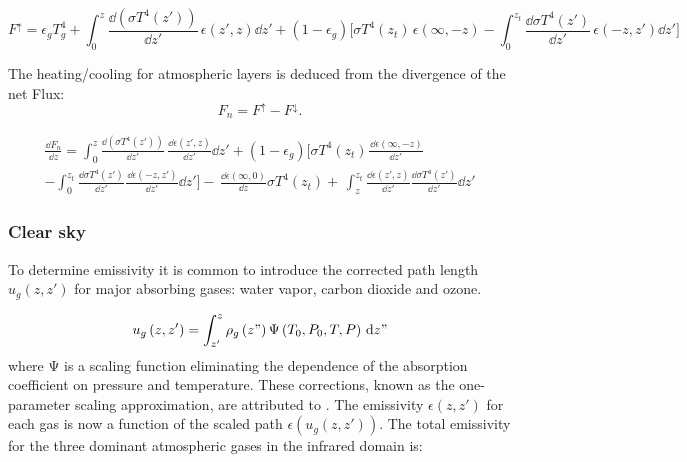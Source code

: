 \begin{equation}
F^\uparrow =\epsilon_{g}T_{g}^{4}+\int_0^z {\frac{\dd\left( \sigma
T^{4}\left( z' \right) \right)}{\dd z'}\, \epsilon \left( z',z
\right)\dd z'+\left( 1-\epsilon_{g} \right)[\sigma T^{4}} \left( z_t
\right)\, \epsilon \left( \infty ,-z \right)-\int_0^{z_t} \frac{\dd\sigma
T^{4}\left( z' \right)}{\dd z'} \, \epsilon (-z,z') \dd z']
\end{equation}

The heating/cooling for atmospheric layers is deduced from the divergence of
the net Flux:
\begin{equation}
F_{n}=F^\uparrow -F^\downarrow .
\end{equation}

\begin{multline}
\frac{\dd F_{n}}{\dd z}=\int_0^z {\frac{\dd\left( \sigma T^{4}\left( z' \right)
\right)}{\dd z'}\, \frac{\dd \epsilon \left( z',z
\right)}{\dd z'}\dd z'
+\left( 1-\epsilon_{g} \right)[\sigma T^{4}} \left(z_t \right)\frac{\, \dd\epsilon \left( \infty ,-z \right)}{\dd z'}\\
-\int_0^{z_t} \frac{\dd\sigma T^{4}\left( z' \right)}{\dd z'} \frac{\, \dd\epsilon \left( -z,z' \right)}{\dd z'}\dd z']
-\, \frac{\dd\epsilon \left( \infty ,0 \right)}{\dd z}\sigma T^{4}\left( z_t \right)
+\, \int_z^{z_t} {\frac{\dd\epsilon (z',z)}{\dd z'}\frac{\dd\sigma T^{4}(z')}{\dd z'}\dd z'}
\end{multline}

\subsubsection{Clear sky}
To determine emissivity it is common to introduce the corrected path length
$u_{g}(z,z')$ for major absorbing gases: water vapor, carbon dioxide and ozone.

\begin{equation}
u_{g}\left( z,z' \right)=\int_{z'}^{z} \rho_{g} \left( z"
\right)\mathrm{\Psi }\left( T_{0},P_{0},T,P \right)\, \mathrm{d} z"
\end{equation}
where $\mathrm{\Psi }$ is a scaling function eliminating the dependence of
the absorption coefficient on pressure and temperature. These corrections,
known as the one-parameter scaling approximation, are attributed to \cite{Chou:1980}.
The emissivity $\epsilon(z,z')$ for each gas is now a
function of the scaled path $\epsilon (u_{g}(z,z'))$. The total emissivity for
the three dominant atmospheric gases in the infrared domain is:


